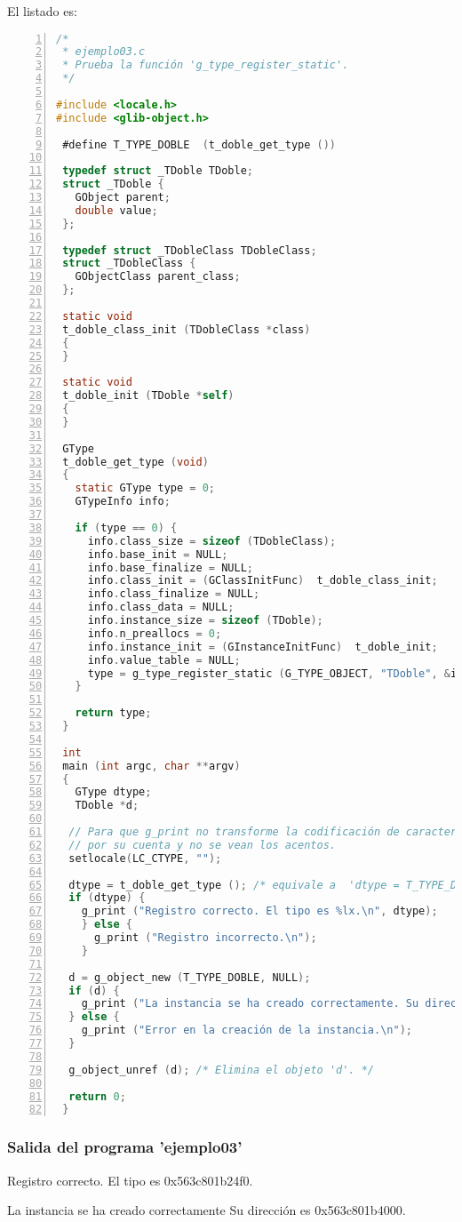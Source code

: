 El listado es:
\begin{lstlisting}[language=C, numbers=left]
/*
 * ejemplo03.c
 * Prueba la función 'g_type_register_static'.
 */

#include <locale.h>
#include <glib-object.h>
 
 #define T_TYPE_DOBLE  (t_doble_get_type ())
 
 typedef struct _TDoble TDoble;
 struct _TDoble {
   GObject parent;
   double value;
 };
 
 typedef struct _TDobleClass TDobleClass;
 struct _TDobleClass {
   GObjectClass parent_class;
 };
 
 static void
 t_doble_class_init (TDobleClass *class)
 {
 }
 
 static void
 t_doble_init (TDoble *self)
 {
 }
 
 GType
 t_doble_get_type (void)
 {
   static GType type = 0;
   GTypeInfo info;
 
   if (type == 0) {
     info.class_size = sizeof (TDobleClass);
     info.base_init = NULL;
     info.base_finalize = NULL;
     info.class_init = (GClassInitFunc)  t_doble_class_init;
     info.class_finalize = NULL;
     info.class_data = NULL;
     info.instance_size = sizeof (TDoble);
     info.n_preallocs = 0;
     info.instance_init = (GInstanceInitFunc)  t_doble_init;
     info.value_table = NULL;
     type = g_type_register_static (G_TYPE_OBJECT, "TDoble", &info, 0);
   }
   
   return type;
 }
 
 int
 main (int argc, char **argv)
 {
   GType dtype;
   TDoble *d;

  // Para que g_print no transforme la codificación de caracteres
  // por su cuenta y no se vean los acentos.
  setlocale(LC_CTYPE, "");
   
  dtype = t_doble_get_type (); /* equivale a  'dtype = T_TYPE_DOBLE' */
  if (dtype) {
    g_print ("Registro correcto. El tipo es %lx.\n", dtype);
    } else {
      g_print ("Registro incorrecto.\n");
    }
 
  d = g_object_new (T_TYPE_DOBLE, NULL);
  if (d) {
    g_print ("La instancia se ha creado correctamente. Su dirección es %p.\n", d);
  } else {
    g_print ("Error en la creación de la instancia.\n");
  }
  
  g_object_unref (d); /* Elimina el objeto 'd'. */
  
  return 0;
 }
 \end{lstlisting}

 \subsubsection{Salida del programa 'ejemplo03'}
\textsf{Registro correcto. El tipo es 0x563c801b24f0.}\par
\textsf{La instancia se ha creado correctamente Su dirección es 0x563c801b4000.}\par

